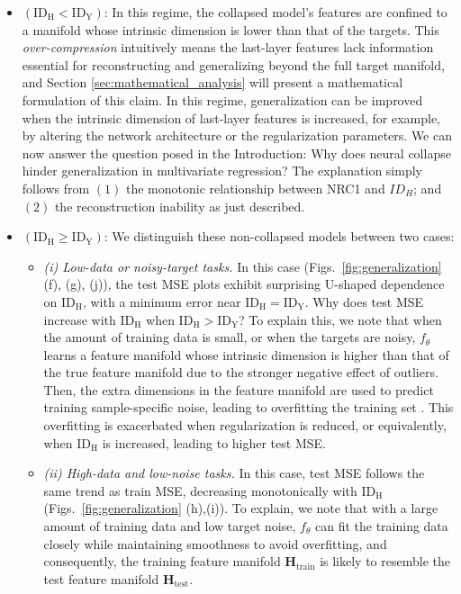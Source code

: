\documentclass{article}
\newcommand{\bH}{{\mathbf H}}
\newcommand{\idh}{\ensuremath{\mathrm{ID}_{\mathrm{H}}}}
\newcommand{\idy}{\ensuremath{\mathrm{ID}_{\mathrm{Y}}}}
\theoremstyle{plain}
\theoremstyle{definition}
\theoremstyle{remark}
\begin{document}
\begin{itemize}[leftmargin=16pt]
    \item $(\idh < \idy)$:
    In this regime, the collapsed model's features are confined to a manifold whose intrinsic dimension is lower than that of the targets. This \textit{over-compression} intuitively means the last-layer features lack information essential for reconstructing and generalizing beyond the full target manifold, and Section \ref{sec:mathematical_analysis} will present a mathematical formulation of this claim. In this regime, generalization can be improved when the intrinsic dimension of last-layer features is increased, for example, by altering the network architecture or the regularization parameters. We can now answer the question posed in the Introduction: Why does neural collapse hinder generalization in multivariate regression? The explanation simply follows from $(1)$ the monotonic relationship between NRC1 and $ID_H$; and $(2)$ the reconstruction inability as just described. 

    \item $(\idh \geq \idy)$: We distinguish these non-collapsed models between two cases:

    \begin{itemize}[leftmargin=12pt]
        \item {\em (i) Low-data or noisy-target tasks.}
            In this case (Figs.~\ref{fig:generalization} (f), (g), (j)), the test MSE plots exhibit surprising U-shaped dependence on $\idh$, with a minimum error near $\idh = \idy$. Why does test MSE increase with $\idh$ when $\idh > \idy$? To explain this, we note that when the amount of training data is small, or when the targets are noisy, $f_\theta$ learns a feature manifold whose intrinsic dimension is higher than that of the true feature manifold due to the stronger negative effect of outliers. Then, the extra dimensions in the feature manifold are used to predict training sample-specific noise, leading to overfitting the training set \citep{ma2018dimensionality, ansuini2019intrinsic}. This overfitting is exacerbated when regularization is reduced, or equivalently, when $\idh$ is increased, leading to higher test MSE.
    
        \item {\em (ii) High-data and low-noise tasks.}
            In this case, test MSE follows the same trend as train MSE, decreasing monotonically with $\idh$ (Figs.~\ref{fig:generalization} (h),(i)). To explain, we note that with a large amount of training data and low target noise, $f_\theta$ can fit the training data closely while maintaining smoothness to avoid overfitting, and consequently, the training feature manifold $\bH_{\text{train}}$ is likely to resemble the test feature manifold $\bH_{\text{test}}$. 
    \end{itemize}
    
\end{itemize}
\end{document}
